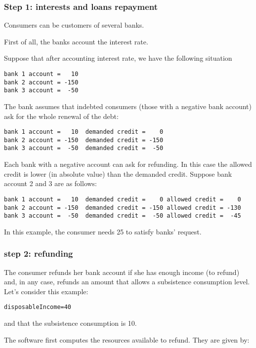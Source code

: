 \documentclass{article}
\begin{document}
\subsubsection*{Step 1: interests and loans repayment}

Consumers can be customers of several banks.

First of all, the banks account the interest rate.

Suppose that after accounting interest rate, we have the following situation
\begin{verbatim}
bank 1 account =   10
bank 2 account = -150
bank 3 account =  -50
\end{verbatim}

The bank assumes that indebted consumers (those with a negative bank account) ask for the whole renewal of the debt:

\begin{verbatim}
bank 1 account =   10  demanded credit =    0
bank 2 account = -150  demanded credit = -150
bank 3 account =  -50  demanded credit =  -50
\end{verbatim}

Each bank with a negative account can ask for refunding. In this case the allowed credit is lower (in absolute value) than the demanded credit.
Suppose bank account 2 and 3 are as follows:

\begin{verbatim}
bank 1 account =   10  demanded credit =    0 allowed credit =    0
bank 2 account = -150  demanded credit = -150 allowed credit = -130 
bank 3 account =  -50  demanded credit =  -50 allowed credit =  -45
\end{verbatim}

In this example, the consumer needs 25 to satisfy banks' request.

\subsubsection*{step 2: refunding}
The consumer refunds her bank account if she has enough income (to refund) and, in any case, refunds an amount that allows a subsistence consumption level. 
\\Let's consider this example:

\verb+disposableIncome=40+

and that the subsistence consumption is 10.

The software first computes the resources available to refund. They are given by:
\end{document}
